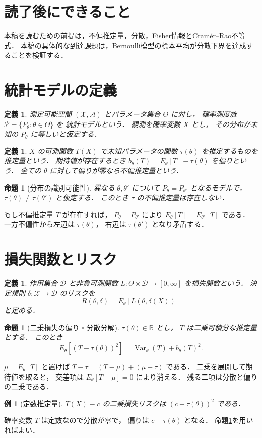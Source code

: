 \documentclass[a5paper,10pt,onecolumn]{jsarticle}
\makeatletter
\theoremstyle{mathnotetheorem}
\newtheorem{definition}[theorem]{定義}
\newtheorem{proposition}[theorem]{命題}
\newtheorem{example}[theorem]{例}
\renewcommand{\proofname}{証明}
\renewenvironment{proof}[1][\proofname]{%
  \par\pushQED{\qed}\normalfont\topsep4\p@\@plus2\p@\relax
  \trivlist\item[\hskip\labelsep\bfseries #1]\ignorespaces
}{\popQED\endtrivlist\@endpefalse}
\makeatother
\begin{document}
\section*{読了後にできること}
本稿を読むための前提は，不偏推定量，分散，Fisher情報とCramér--Rao不等式．
本稿の具体的な到達課題は，Bernoulli模型の標本平均が分散下界を達成することを検証する．

\section{統計モデルの定義}
\begin{definition}
測定可能空間 $(\mathcal X,\mathcal A)$ とパラメータ集合
$\Theta$ に対し，
確率測度族 $\mathcal P=\{P_\theta:\theta\in\Theta\}$ を
統計モデルという．
観測を確率変数 $X$ とし，
その分布が未知の $P_\theta$ に等しいと仮定する．
\end{definition}
\begin{definition}
$X$ の可測関数 $T(X)$ で未知パラメータの関数
$\tau(\theta)$ を推定するものを推定量という．
期待値が存在するとき
$b_\theta(T)=E_\theta[T]-\tau(\theta)$ を偏りという．
全ての $\theta$ に対して偏りが零なら不偏推定量という．
\end{definition}
\begin{proposition}[分布の識別可能性]
異なる $\theta,\theta'$ について
$P_\theta=P_{\theta'}$ となるモデルで，
$\tau(\theta)\ne\tau(\theta')$ と仮定する．
このとき $\tau$ の不偏推定量は存在しない．
\end{proposition}
\begin{proof}
もし不偏推定量 $T$ が存在すれば，
$P_\theta=P_{\theta'}$ により
$E_\theta[T]=E_{\theta'}[T]$ である．
一方不偏性から左辺は $\tau(\theta)$，
右辺は $\tau(\theta')$ となり矛盾する．
\end{proof}
\section{損失関数とリスク}
\begin{definition}
作用集合 $\mathcal D$ と非負可測関数
$L:\Theta\times\mathcal D\to[0,\infty]$ を損失関数という．
決定規則 $\delta:\mathcal X\to\mathcal D$ のリスクを
\[
 R(\theta,\delta)=E_\theta[L(\theta,\delta(X))]
\]
と定める．
\end{definition}
\begin{proposition}[二乗損失の偏り・分散分解]\label{prop:biasvar}
$\tau(\theta)\in\mathbb R$ とし，
$T$ は二乗可積分な推定量とする．
このとき
\[
 E_\theta[(T-\tau(\theta))^2]
 =\operatorname{Var}_\theta(T)+b_\theta(T)^2.
\]
\end{proposition}
\begin{proof}
$\mu=E_\theta[T]$ と置けば
$T-\tau=(T-\mu)+(\mu-\tau)$ である．
二乗を展開して期待値を取ると，
交差項は $E_\theta[T-\mu]=0$ により消える．
残る二項は分散と偏りの二乗である．
\end{proof}
\begin{example}[定数推定量]
$T(X)\equiv c$ の二乗損失リスクは
$(c-\tau(\theta))^2$ である．
\end{example}
\begin{proof}
確率変数 $T$ は定数なので分散が零で，
偏りは $c-\tau(\theta)$ となる．
命題\ref{prop:biasvar}を用いればよい．
\end{proof}
\end{document}
